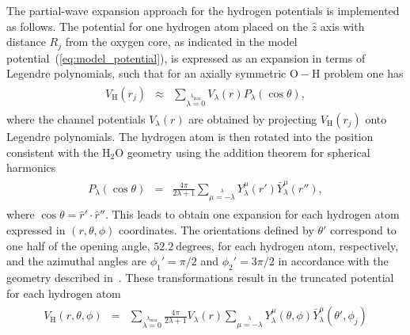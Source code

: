 The partial-wave expansion approach for the hydrogen potentials is
implemented as follows. The potential for one hydrogen atom placed on
the $\hat{z}$ axis with distance $R_{j}$ from the oxygen core, as
indicated in the model potential~(\ref{eq:model_potential}), is
expressed as an expansion in terms of Legendre polynomials, such that
for an axially symmetric $\mathrm{O}-\mathrm{H}$ problem one has
%
\begin{eqnarray}
  \begin{split}
    V_{\mathrm{H}}(r_{j}) & \approx & \sum\limits_{\lambda=0}
    \limits^{\lambda_{\mathrm{max}}} V_{\lambda}(r) P_{\lambda}(\cos\theta),
  \end{split}
  \label{eq:Legendre-pols}
\end{eqnarray}
%
where the channel potentials $V_{\lambda}(r)$ are obtained by
projecting $V_{\mathrm{H}}(r_{j})$ onto Legendre polynomials. The
hydrogen atom is then rotated into the position consistent with the
H$_{2}$O geometry using the addition theorem for spherical harmonics
%
\begin{eqnarray}
  \begin{split}
    P_{\lambda}(\cos\theta) & = & \frac{4\pi}{2\lambda + 1}
    \sum\limits_{\mu = -\lambda}\limits^{\lambda} Y_{\lambda}^{\mu}(\hat{r}')
    \bar{Y}_{\lambda}^{\mu}(\hat{r}''),
  \end{split}
  \label{eq:add_sphericalYlm}
\end{eqnarray}
%
where $\cos\theta = \hat{r}'\cdot\hat{r}''$. This leads to obtain one
expansion for each hydrogen atom expressed in $(r,\theta,\phi)$
coordinates. The orientations defined by $\theta'$ correspond to one
half of the opening angle, $52.2\ \mathrm{degrees}$, for each hydrogen
atom, respectively, and the azimuthal angles are $\phi_{1}'=\pi/2$ and
$\phi_{2}'=3\pi/2$ in accordance with the geometry described
in~\cite{Moccia_1964}. These transformations result in the truncated
potential for each hydrogen atom
%
\begin{eqnarray}
  \begin{split}
    V_{\mathrm{H}}(r,\theta,\phi) & = & \sum\limits_{\lambda=0}
    \limits^{\lambda_{\mathrm{max}}} \frac{4\pi}{2\lambda + 1} V_{\lambda}(r)
    \sum\limits_{\mu=-\lambda}\limits^{\lambda} Y_{\lambda}^{\mu}(\theta,\phi)
    \bar{Y}_{\lambda}^{\mu}(\theta',\phi_{j})
  \end{split}
  \label{eq:expanded_H_potential}
\end{eqnarray}
%


